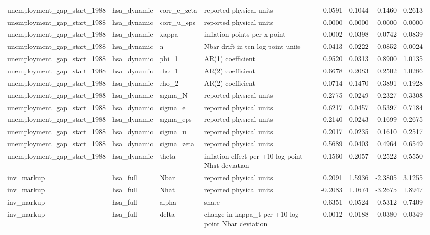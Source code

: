 \begin{tabular}{llllrrrr}
unemployment\_gap\_start\_1988 & hsa\_dynamic & corr\_e\_zeta & reported physical units & 0.0591 & 0.1044 & -0.1460 & 0.2613 \\
unemployment\_gap\_start\_1988 & hsa\_dynamic & corr\_u\_eps & reported physical units & 0.0000 & 0.0000 & 0.0000 & 0.0000 \\
unemployment\_gap\_start\_1988 & hsa\_dynamic & kappa & inflation points per x point & 0.0002 & 0.0398 & -0.0742 & 0.0839 \\
unemployment\_gap\_start\_1988 & hsa\_dynamic & n & Nbar drift in ten-log-point units & -0.0413 & 0.0222 & -0.0852 & 0.0024 \\
unemployment\_gap\_start\_1988 & hsa\_dynamic & phi\_1 & AR(1) coefficient & 0.9520 & 0.0313 & 0.8900 & 1.0135 \\
unemployment\_gap\_start\_1988 & hsa\_dynamic & rho\_1 & AR(2) coefficient & 0.6678 & 0.2083 & 0.2502 & 1.0286 \\
unemployment\_gap\_start\_1988 & hsa\_dynamic & rho\_2 & AR(2) coefficient & -0.0714 & 0.1470 & -0.3891 & 0.1928 \\
unemployment\_gap\_start\_1988 & hsa\_dynamic & sigma\_N & reported physical units & 0.2775 & 0.0249 & 0.2327 & 0.3308 \\
unemployment\_gap\_start\_1988 & hsa\_dynamic & sigma\_e & reported physical units & 0.6217 & 0.0457 & 0.5397 & 0.7184 \\
unemployment\_gap\_start\_1988 & hsa\_dynamic & sigma\_eps & reported physical units & 0.2140 & 0.0243 & 0.1699 & 0.2675 \\
unemployment\_gap\_start\_1988 & hsa\_dynamic & sigma\_u & reported physical units & 0.2017 & 0.0235 & 0.1610 & 0.2517 \\
unemployment\_gap\_start\_1988 & hsa\_dynamic & sigma\_zeta & reported physical units & 0.5689 & 0.0403 & 0.4964 & 0.6549 \\
unemployment\_gap\_start\_1988 & hsa\_dynamic & theta & inflation effect per +10 log-point Nhat deviation & 0.1560 & 0.2057 & -0.2522 & 0.5550 \\
inv\_markup & hsa\_full & Nbar & reported physical units & 0.2091 & 1.5936 & -2.3805 & 3.1255 \\
inv\_markup & hsa\_full & Nhat & reported physical units & -0.2083 & 1.1674 & -3.2675 & 1.8947 \\
inv\_markup & hsa\_full & alpha & share & 0.6351 & 0.0524 & 0.5312 & 0.7409 \\
inv\_markup & hsa\_full & delta & change in kappa\_t per +10 log-point Nbar deviation & -0.0012 & 0.0188 & -0.0380 & 0.0349 \\

\end{tabular}
